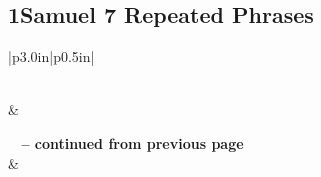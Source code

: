 \subsection{1Samuel 7 Repeated Phrases}


\normalsize
 
\begin{center}
\begin{longtable}{|p{3.0in}|p{0.5in}|}
\caption[1Samuel 7 Repeated Phrases]{1Samuel 7 Repeated Phrases}\label{table:Repeated Phrases 1Samuel 7} \\
\hline {} &  \\ \hline 
\endfirsthead
 
{{\bfseries \tablename\ \thetable{} -- continued from previous page}} \\  
\hline {} &  \\ \hline 
\endhead
 

\end{longtable}
\end{center}
